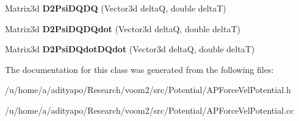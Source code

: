 \begin{DoxyCompactItemize}
\item 
\hypertarget{classvoom_1_1_a_p_force_vel_potential_abc09e482db34a739a857905c35b47105}{
Matrix3d {\bfseries D2PsiDQDQ} (Vector3d deltaQ, double deltaT)}
\label{classvoom_1_1_a_p_force_vel_potential_abc09e482db34a739a857905c35b47105}

\item 
\hypertarget{classvoom_1_1_a_p_force_vel_potential_a23d7355ee315327fd23d65cfe679868a}{
Matrix3d {\bfseries D2PsiDQDQdot} (Vector3d deltaQ, double deltaT)}
\label{classvoom_1_1_a_p_force_vel_potential_a23d7355ee315327fd23d65cfe679868a}

\item 
\hypertarget{classvoom_1_1_a_p_force_vel_potential_a159b874e9fb31815e0f842f28eb40e2b}{
Matrix3d {\bfseries D2PsiDQdotDQdot} (Vector3d deltaQ, double deltaT)}
\label{classvoom_1_1_a_p_force_vel_potential_a159b874e9fb31815e0f842f28eb40e2b}

\end{DoxyCompactItemize}


The documentation for this class was generated from the following files:\begin{DoxyCompactItemize}
\item 
/u/home/a/adityapo/Research/voom2/src/Potential/APForceVelPotential.h\item 
/u/home/a/adityapo/Research/voom2/src/Potential/APForceVelPotential.cc\end{DoxyCompactItemize}
